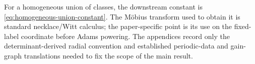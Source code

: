 For a homogeneous union of classes, the downstream constant is
\eqref{eq:homogeneous-union-constant}.  The M\"obius transform used to obtain
it is standard necklace/Witt calculus; the paper-specific point is its use on
the fixed-label coordinate before Adams powering.  The appendices record only
the determinant-derived radial convention and established periodic-data and
gain-graph translations needed to fix the scope of the main result.
